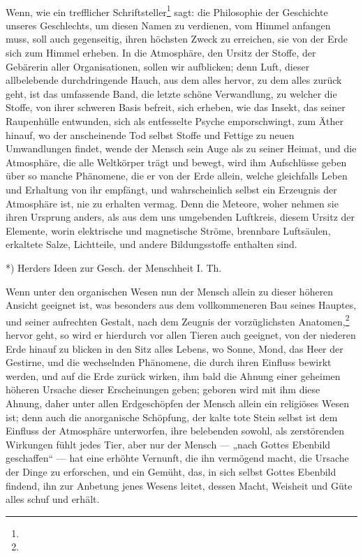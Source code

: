 \documentclass[a4paper, 11pt, oneside, polutonikogreek, german]{article}
\begin{document}
\paragraph{}
Wenn, wie ein trefflicher Schriftsteller\footnote{} sagt: die Philosophie der Geschichte unseres Geschlechts, um diesen Namen zu verdienen, vom Himmel anfangen muss, soll auch gegenseitig, ihren höchsten Zweck zu erreichen, sie von der Erde sich zum Himmel erheben. In die Atmosphäre, den Ursitz der Stoffe, der Gebärerin aller Organisationen, sollen wir aufblicken; denn Luft, dieser allbelebende durchdringende Hauch, aus dem alles hervor, zu dem alles zurück geht, ist das umfassende Band, die letzte schöne Verwandlung, zu welcher die Stoffe, von ihrer schweren Basis befreit, sich erheben, wie das Insekt, das seiner Raupenhülle entwunden, sich als entfesselte Psyche emporschwingt, zum Äther hinauf, wo der anscheinende Tod selbst Stoffe und Fettige zu neuen Umwandlungen findet, wende der Mensch sein Auge als zu seiner Heimat, und die Atmosphäre, die alle Weltkörper trägt und bewegt, wird ihm Aufschlüsse geben über so manche Phänomene, die er von der Erde allein, welche gleichfalls Leben und Erhaltung von ihr empfängt, und wahrscheinlich selbst ein Erzeugnis der Atmosphäre ist, nie zu erhalten vermag. Denn die Meteore, woher nehmen sie ihren Ursprung anders, als aus dem uns umgebenden Luftkreis, diesem Ursitz der Elemente, worin elektrische und magnetische Ströme, brennbare Luftsäulen, erkaltete Salze, Lichtteile, und andere Bildungsstoffe enthalten sind.

*) Herders Ideen zur Gesch. der Menschheit I. Th.

Wenn unter den organischen Wesen nun der Mensch allein zu dieser höheren Ansicht geeignet ist, was besonders aus dem vollkommeneren Bau seines Hauptes, und seiner aufrechten Gestalt, nach dem Zeugnis der vorzüglichsten Anatomen,\footnote{} hervor geht, so wird er hierdurch vor allen Tieren auch geeignet, von der niederen Erde hinauf zu blicken in den Sitz alles Lebens, wo Sonne, Mond, das Heer der Gestirne, und die wechselnden Phänomene, die durch ihren Einfluss bewirkt werden, und auf die Erde zurück wirken, ihm bald die Ahnung einer geheimen höheren Ursache dieser Erscheinungen geben; geboren wird mit ihm diese Ahnung, daher unter allen Erdgeschöpfen der Mensch allein ein religiöses Wesen ist; denn auch die anorganische Schöpfung, der kalte tote Stein selbst ist dem Einfluss der Atmosphäre unterworfen, ihre belebenden sowohl, als zerstörenden Wirkungen fühlt jedes Tier, aber nur der Mensch --- „nach Gottes Ebenbild geschaffen“ --- hat eine erhöhte Vernunft, die ihn vermögend macht, die Ursache der Dinge zu erforschen, und ein Gemüht, das, in sich selbst Gottes Ebenbild findend, ihn zur Anbetung jenes Wesens leitet, dessen Macht, Weisheit und Güte alles schuf und erhält.
\end{document}
